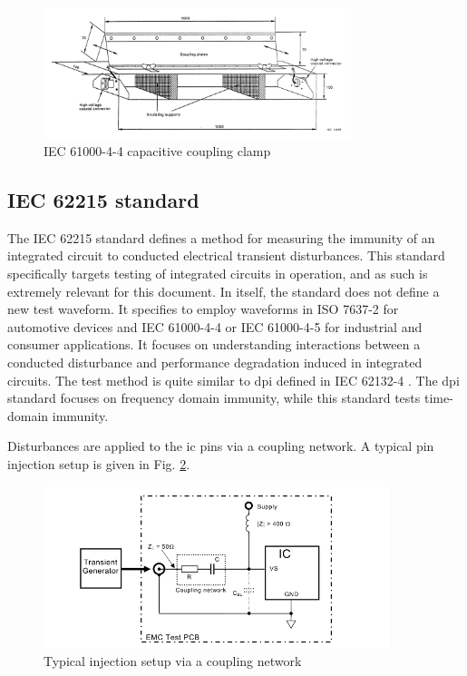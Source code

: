 \begin{figure}[!h]
  \centering
  \includegraphics[width=0.8\textwidth]{src/1/figures/iec61000-4-4_clamp.png}
  \caption{IEC 61000-4-4 capacitive coupling clamp}
  \label{fig:iec_4_4_clamp}
\end{figure}

\subsection{IEC 62215 standard}

The IEC 62215 standard \cite{iec62215} defines a method for measuring the immunity of an integrated circuit to conducted electrical transient disturbances.
This standard specifically targets testing of integrated circuits in operation, and as such is extremely relevant for this document.
In itself, the standard does not define a new test waveform.
It specifies to employ waveforms in ISO 7637-2 \cite{iso7637-2} for automotive devices and IEC 61000-4-4 \cite{iec61000-4-4} or IEC 61000-4-5 for industrial and consumer applications.
It focuses on understanding interactions between a conducted disturbance and performance degradation induced in integrated circuits.
The test method is quite similar to \gls{dpi} defined in IEC 62132-4 \cite{iec62132-4}.
The \gls{dpi} standard focuses on frequency domain immunity, while this standard tests time-domain immunity.

Disturbances are applied to the \gls{ic} pins via a coupling network.
A typical pin injection setup is given in Fig. \ref{fig:iec62215_setup}.

\begin{figure}[!h]
  \centering
  \includegraphics[width=0.9\textwidth]{src/1/figures/iec62215_setup.png}
  \caption{Typical injection setup via a coupling network}
  \label{fig:iec62215_setup}
\end{figure}

